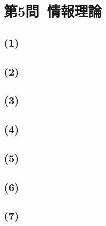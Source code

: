 \documentclass[a4paper,12pt,xelatex,ja=standard]{bxjsarticle}
\begin{document}
\section*{第5問\ 情報理論}
\subsection*{(1)}
\subsection*{(2)}
\subsection*{(3)}
\subsection*{(4)}
\subsection*{(5)}
\subsection*{(6)}
\subsection*{(7)}
\end{document}
